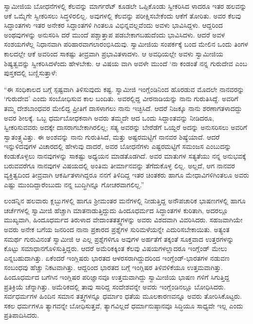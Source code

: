 ಸ್ವಾಮೀಜಿಯ ಬೋಧನೆಗಳಲ್ಲಿ ಕೆಲವನ್ನು ಮಾರ್ಗರೆಟ್ ಕೂಡಲೇ ಒಪ್ಪಿಕೊಂಡು ಸ್ವೀಕರಿಸಿದ ಳಾದರೂ ಇತರ ಹಲವನ್ನು ಆಕೆ ಒಮ್ಮೆಗೇ ಸ್ವೀಕರಿಸಲು ಸಿದ್ಧಳಿರಲಿಲ್ಲ. ಅವುಗಳಲ್ಲಿ ಕೆಲವನ್ನು ಪರೀಕ್ಷಿಸಬೇಕೆಂದು ಆಕೆಗೆ ತೋರಿತು. ಅವರ ಕೆಲವು ಸಿದ್ಧಾಂತಗಳು ಇತರ ಅನೇಕರ ಸಿದ್ಧಾಂತಗಳಿ ಗಿಂತಲೂ ವಿಭಿನ್ನವಲ್ಲವೆಂದು ಅವಳು ಭಾವಿಸಿದ್ದಳು. ಆದ್ದರಿಂದ ಅಂಥವುಗಳನ್ನು ಅನುಸರಿಸಿ ದರೆ ಮುಂದೆ ಪಶ್ಚಾತ್ತಾಪ ಪಡಬೇಕಾಗಬಹುದೆಂದು ಭಾವಿಸಿದಳು. ಆದರೆ ಅವಳ ಸಂಶಯಗಳೆಲ್ಲ ನಿಧಾನವಾಗಿ ಪರಿಹಾರವಾಗಲಾರಂಭಿಸಿದುವು. ಸ್ವಾಮೀಜಿಯ ಸಂಪರ್ಕಕ್ಕೆ ಬಂದ ಮೇಲಿನ ಒಂದು ತಿಂಗಳ ಕಾಲದಲ್ಲೇ ಆಕೆ ಅವರಿಂದ ಸಾಕಷ್ಟು ತೀವ್ರವಾಗಿ ಪ್ರಭಾವಿತಳಾದಳು. ಆ ಅವಧಿಯಲ್ಲೇ ಅವಳು ಸ್ವಾಮೀಜಿಯ ಶಿಷ್ಯತ್ವವನ್ನು ಸ್ವೀಕರಿಸಿದಳೆಂದು ಹೇಳಬೇಕು. ಆ ವಿಷಯ ವಾಗಿ ಅವಳೇ ಮುಂದೆ ‘ನಾ ಕಂಡಂತೆ ನನ್ನ ಗುರುದೇವ ಎಂಬ ಪುಸ್ತಕದಲ್ಲಿ ಬಣ್ಣಿಸುತ್ತಾಳೆ:

“ಈ ಸಂಧಿಕಾಲದ ಬಗ್ಗೆ ಸ್ಪಷ್ಟವಾಗಿ ತಿಳಿಸುವುದು ಕಷ್ಟ. ಸ್ವಾಮೀಜಿ ಇಂಗ್ಲೆಂಡಿನಿಂದ ಹೊರಡುವ ಮೊದಲೇ ನಾನವರನ್ನು ‘ಗುರುದೇವ’ ಎಂದು ಸಂಬೋಧಿಸುವ ಕಾಲ ಬಂದಿತು. ಅವರಲ್ಲಿದ್ದ ವೀರನಾಡಿಯನ್ನು ನಾನು ಗುರುತಿಸಿದ್ದೆ. ಅವರಿಗೆ ತಮ್ಮ ದೇಶಬಾಂಧವರ ಮೇಲಿದ್ದ ಪ್ರೀತಿಗೆ ದಾಸಳಾಗಲು ನಾನು ಇಚ್ಛಿಸಿದೆ. ಆದರೆ ನಿಜಕ್ಕೂ ನಾನು ಶರಣಾಗತಳಾದದ್ದು ಅವರ ಶೀಲಕ್ಕೆ. ಒಬ್ಬ ಧರ್ಮಬೋಧಕನಾಗಿ ಅವರು ತಮ್ಮದೇ ಆದ ಒಂದು ಸಿದ್ದಾಂತವನ್ನು ನೀಡಿದರೂ, ಸ್ವೀಕರಿಸುವವರು ಅದಕ್ಕೇ ದಾಸರಾಗಬೇಕಾಗಿರಲಿಲ್ಲ; ಸತ್ಯ ಅವರನ್ನು ಬೇರೆಡೆಗೆ ಒಯ್ದರೆ ಅದನ್ನು ಅನುಸರಿಸಲು ಅವರಿಗೆ ಸ್ವಾತಂತ್ರ್ಯವಿತ್ತು. ಈ ಅಂಶವನ್ನು ನಾನು ಗುರುತಿಸಿದೆ, ಮತ್ತು ಅಷ್ಟರಮಟ್ಟಿಗೆ ನಾನವರ ಶಿಷ್ಯೆಯಾದೆ. ಆದರೆ ಇನ್ನುಳಿದವುಗಳ ವಿಚಾರದಲ್ಲಿ ಹೇಳುವು ದಾದರೆ, ಅವರ ಬೋಧನೆಗಳು ಎಷ್ಟರಮಟ್ಟಿಗೆ ಸಮಂಜಸ ಎಂಬುದನ್ನು ಕಂಡುಕೊಳ್ಳಲು ನಾನವುಗಳನ್ನು ಸಾಕಷ್ಟು ಅಧ್ಯಯನ ಮಾಡತೊಡಗಿದೆ. ಅವರ ಮಾತುಗಳ ಸತ್ಯತೆಯು ನನ್ನ ಅನುಭವಕ್ಕೆ ಬರುವವರೆಗೂ ನಾನವುಗಳ ವಿಷಯದಲ್ಲಿ ಅಂತಿಮ ತೀರ್ಮಾನವನ್ನು ತೆಗೆದುಕೊಳ್ಳ ಲಿಲ್ಲ. ಅಲ್ಲದೆ, ಆಗ ನಾನವರ ವ್ಯಕ್ತಿತ್ವದಿಂದ ತೀವ್ರವಾಗಿ ಆಕರ್ಷಿತಳಾಗಿದ್ದರೂ ನನಗೆ ತಿಳಿದಿದ್ದ ಇತರ ಚಿಂತಕರು ಹಾಗೂ ಮೇಧಾವಿಗಳಿಗಿಂತಲೂ ಅವರು ಎಷ್ಟು ಮುಂದಿದ್ದಾರೆಂಬುದು ನನ್ನ ಬುದ್ಧಿಗಿನ್ನೂ ಗೋಚರವಾಗಲಿಲ್ಲ.”

ಲಂಡನ್ನಿನ ಹಲವಾರು ಕ್ಲಬ್ಬುಗಳಲ್ಲಿ ಹಾಗೂ ಶ್ರೀಮಂತರ ಮನೆಗಳಲ್ಲಿ ನೀಡುತ್ತಿದ್ದ ಅನೌಪಚಾರಿಕ ಭಾಷಣಗಳಲ್ಲಿ ಹಾಗೂ ಚರ್ಚೆಗಳಲ್ಲಿ ಸ್ವಾಮೀಜಿ ಹೆಚ್ಚಾಗಿ ಮಾತನಾಡುತ್ತಿದ್ದುದು ಹಿಂದೂಧರ್ಮದ ಸಿದ್ಧಾಂತಗಳ ಕುರಿತಾಗಿ, ಅದರಲ್ಲೂ ಮುಖ್ಯವಾಗಿ, ಹಿಂದೂಧರ್ಮದ ತಿರುಳಾದ ವೇದಾಂತತತ್ತ್ವಗಳನ್ನು ಅವರು ವಿಶದವಾಗಿ ವಿವರಿಸಿದರು. ಸಹಜವಾಗಿಯೇ ಅವರು ಅನೇಕ ಬಗೆಯ ಜನರಿಂದ ನಾನಾ ಪ್ರಕಾರದ ಪ್ರಶ್ನೆಗಳ ಸುರಿಮಳೆಯನ್ನೇ ಎದುರಿಸಬೇಕಾಯಿತು. ಅತ್ಯಂತ ಸಮರ್ಥ ಗುರುವಿನಂತೆ ಸ್ವಾಮೀಜಿ ಆ ಎಲ್ಲ ಪ್ರಶ್ನೆಗಳಿಗೂ ಅವುಗಳ ಅರ್ಹತೆಗೆ ತಕ್ಕಂತೆ ಸೂಕ್ತವಾದ ಉತ್ತರಗಳನ್ನು ಕೊಟ್ಟು ಸಮಾಧಾನಗೊಳಿಸುತ್ತಿದ್ದರು. ಆದರೆ ಅಮೆರಿಕಕ್ಕಿಂತ ಕೆಲವು ವಿಷಯಗಳಲ್ಲಾದರೂ ಇಂಗ್ಲೆಂಡ್ ಮೇಲು ಎನ್ನಬಹುದಾಗಿತ್ತು. ಏಕೆಂದರೆ ಇಂಗ್ಲಿಷರು ಭಾರತದ ಆಳರಸರಾಗಿದ್ದುದರಿಂದ ಇಂಗ್ಲೆಂಡ್​-ಭಾರತಗಳ ನಡುವಣ ಸಂಬಂಧವು ಹೆಚ್ಚು ನಿಕಟವಾಗಿತ್ತು. ಆದ್ದರಿಂದ ಭಾರತದ ಬಗ್ಗೆ ಇಂಗ್ಲಿಷರ ತಿಳಿವಳಿಕೆಯೂ ಉತ್ತಮವಾಗಿತ್ತು. ಹಿಂದೂಧರ್ಮದ ಬಗೆಗಿನ ಇಂಗ್ಲಿಷರ ಪರಿಜ್ಞಾನವೂ ಉತ್ತಮವಾಗಿದ್ದು ಸ್ವಾಮೀಜಿಯ ಭಾಷಣ ಗಳಿಗೆ ಸಿಗುತ್ತಿದ್ದ ಪ್ರತಿಕ್ರಿಯೆ ಚೆನ್ನಾಗಿತ್ತು. ಅಮೆರಿಕದಲ್ಲಿ ತಾವು ಸಾರಿದ್ದ ಸಂದೇಶವನ್ನೇ ಅವರು ಇಂಗ್ಲೆಂಡಿನಲ್ಲೂ ಬೋಧಿಸಿದರು. ಸರ್ವಧರ್ಮಗಳ ಹಿಂದಿನ ಸಮಾನ ತತ್ತ್ವಗಳನ್ನೂ ಧರ್ಮಾಂ ಧತೆಯ ಮೂಲಕಾರಣವನ್ನೂ ಅವರು ತೋರಿಸಿಕೊಟ್ಟರು. ಸಕಲ ಧರ್ಮಗಳೂ ತ್ಯಾಗವನ್ನೇ ಬೋಧಿಸುತ್ತವೆ, ತ್ಯಾಗವಿಲ್ಲದೆ ಧರ್ಮಾನುಷ್ಠಾನವೂ ಸಿದ್ಧಿಯೂ ಸಾಧ್ಯವೇ ಇಲ್ಲ ಎಂದು ಪ್ರತಿಪಾದಿಸಿದರು.

